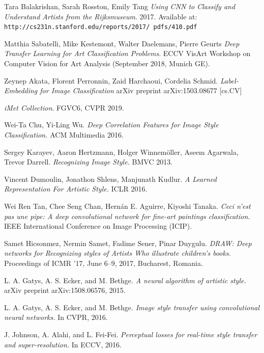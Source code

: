 \documentclass[10pt,twocolumn,letterpaper]{article}
\begin{document}
{\small

\begin{thebibliography}{9}

Tara Balakrishan, Sarah Rosston, Emily Tang
\textit{Using CNN to Classify and Understand Artists from the Rijksmuseum}.
2017. Available at: \texttt{http://cs231n.stanford.edu/reports/2017/ pdfs/410.pdf}

Matthia Sabatelli, Mike Kestemont, Walter Daelemans, Pierre Geurts
\textit{Deep Transfer Learning for Art Classification Problems}.
ECCV VisArt Workshop on Computer Vision for Art Analysis (September 2018, Munich GE).

Zeynep Akata, Florent Perronnin, Zaid Harchaoui, Cordelia Schmid. 
\textit{Label-Embedding for Image Classification}
arXiv preprint arXiv:1503.08677 [cs.CV]


\textit{iMet Collection}. 
 FGVC6, CVPR 2019.

Wei-Ta Chu, Yi-Ling Wu.
\textit{Deep Correlation Features for Image Style Classification.}
ACM Multimedia 2016.

Sergey Karayev, Aaron Hertzmann, Holger Winnemöller, Aseem Agarwala, Trevor Darrell.
\textit{Recognizing Image Style.}
BMVC 2013.

Vincent Dumoulin, Jonathon Shlens, Manjunath Kudlur.
\textit{A Learned Representation For Artistic Style.}
ICLR 2016.

Wei Ren Tan, Chee Seng Chan, Hernán E. Aguirre, Kiyoshi Tanaka.
\textit{Ceci n'est pas une pipe: A deep convolutional network for fine-art paintings classification.}
IEEE International Conference on Image Processing (ICIP).

Samet Hicsonmez, Nermin Samet, Fadime Sener, Pinar Duygulu.
\textit{DRAW: Deep networks for Recognizing styles of Artists Who illustrate children's books.}
Proceedings of ICMR ’17, June 6–9, 2017, Bucharest, Romania.

L. A. Gatys, A. S. Ecker, and M. Bethge.
\textit{A neural algorithm of artistic style.}
arXiv preprint arXiv:1508.06576, 2015.

L. A. Gatys, A. S. Ecker, and M. Bethge.
\textit{Image style transfer using convolutional neural networks.}
In CVPR, 2016.

J. Johnson, A. Alahi, and L. Fei-Fei.
\textit{ Perceptual losses for real-time style transfer and super-resolution.}
In ECCV, 2016.


\end{thebibliography}}
\end{document}
